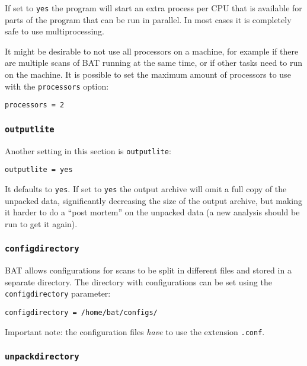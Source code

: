 \documentclass[10pt,a4paper]{article}
\begin{document}
If set to \texttt{yes} the program will start an extra process per CPU that is
available for parts of the program that can be run in parallel. In most cases
it is completely safe to use multiprocessing.

It might be desirable to not use all processors on a machine, for example if
there are multiple scans of BAT running at the same time, or if other tasks
need to run on the machine. It is possible to set the maximum amount of
processors to use with the \texttt{processors} option:

\begin{verbatim}
processors = 2
\end{verbatim}

\subsubsection{\texttt{outputlite}}

Another setting in this section is \texttt{outputlite}:

\begin{verbatim}
outputlite = yes
\end{verbatim}

It defaults to \texttt{yes}. If set to \texttt{yes} the output archive will omit
a full copy of the unpacked data, significantly decreasing the size of the
output archive, but making it harder to do a ``post mortem'' on the unpacked
data (a new analysis should be run to get it again).

\subsubsection{\texttt{configdirectory}}

BAT allows configurations for scans to be split in different files and stored
in a separate directory. The directory with configurations can be set using the
\texttt{configdirectory} parameter:

\begin{verbatim}
configdirectory = /home/bat/configs/
\end{verbatim}

Important note: the configuration files \textit{have} to use the extension
\texttt{.conf}.

\subsubsection{\texttt{unpackdirectory}}
\end{document}
